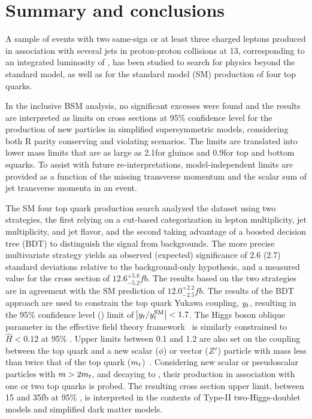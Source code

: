\chapter{Summary and conclusions}
\label{chap:summary}

A sample of events with two same-sign or at least three charged leptons
produced in association with several jets in proton-proton collisions at
13\TeV, corresponding to an integrated luminosity of \sslumi, has been
studied to search for physics beyond the standard model, as well as for the
standard model (SM) production of four top quarks.

In the inclusive BSM analysis, no significant excesses were found and the
results are interpreted as limits on cross sections at 95\% confidence level
for the production of new particles in simplified supersymmetric models,
considering both R parity conserving and violating scenarios. The limits
are translated into lower mass limits that are as large as 2.1\TeV for
gluinos and 0.9\TeV for top and bottom squarks. 
To assist with future re-interpretations, model-independent limits are
provided as a function of the missing transverse momentum and the scalar sum
of jet transverse momenta in an event.

The SM four top quark production search analyzed the dataset using two
strategies, the first relying on a cut-based categorization in lepton
multiplicity, jet multiplicity, and jet flavor, and the second taking
advantage of a boosted decision tree (BDT) to distinguish the \tttt signal
from backgrounds. The more precise multivariate strategy yields an observed
(expected) significance of 2.6 (2.7) standard deviations relative to the
background-only hypothesis, and a measured value for the \tttt cross section
of $12.6^{+5.8}_{-5.2}\unit{fb}$. The results based on the two strategies are
in agreement with the SM prediction of $12.0^{+2.2}_{-2.5}\unit{fb}$. The
results of the BDT approach are used to constrain the top quark Yukawa
coupling, $y_{t}$, resulting in the 95\% confidence level (\CL) limit of
$\abs{y_{t}/y_{t}^{\mathrm{SM}}} < 1.7$. The Higgs boson oblique
parameter in the effective field theory
framework~\cite{THEORY:ObliqueHiggs2019} is similarly constrained to $\hat{H}
< 0.12$ at 95\% \CL. Upper limits between 0.1 and 1.2 are also set on the
coupling between the top quark and a new scalar ($\phi$) or vector ($Z^\prime$)
particle with mass less than twice that of the top quark
($m_t$)~\cite{THEORY:Alvarez2016nrz}. Considering new scalar or
pseudoscalar particles with $m > 2m_t$, and decaying to \ttbar,
their production in association with one or two top quarks is probed.
The resulting cross section upper limit, between 15 and
35\unit{fb} at 95\% \CL, is interpreted in the contexts of Type-II
two-Higgs-doublet models and simplified dark matter models.

